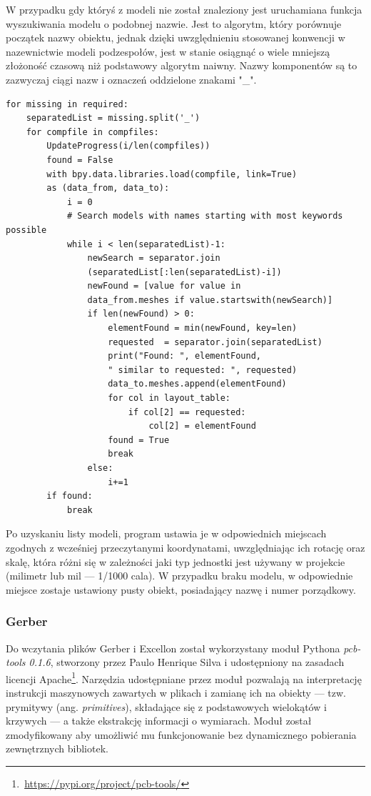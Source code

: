 \documentclass[brudnopis]{xmgr}
\begin{document}
W przypadku gdy któryś z modeli nie został znaleziony jest uruchamiana funkcja wyszukiwania modelu o podobnej nazwie. Jest to algorytm, który porównuje początek nazwy obiektu, jednak dzięki uwzględnieniu stosowanej konwencji w nazewnictwie modeli podzespołów, jest w stanie osiągnąć o wiele mniejszą złożoność czasową niż podstawowy algorytm naiwny. Nazwy komponentów są to zazwyczaj ciągi nazw i oznaczeń oddzielone znakami "\_".
\begin{lstlisting}
for missing in required:
    separatedList = missing.split('_')
    for compfile in compfiles:
        UpdateProgress(i/len(compfiles))
        found = False
        with bpy.data.libraries.load(compfile, link=True)
        as (data_from, data_to):
            i = 0
            # Search models with names starting with most keywords possible
            while i < len(separatedList)-1:
                newSearch = separator.join
                (separatedList[:len(separatedList)-i])
                newFound = [value for value in
                data_from.meshes if value.startswith(newSearch)]
                if len(newFound) > 0:
                    elementFound = min(newFound, key=len)
                    requested  = separator.join(separatedList)
                    print("Found: ", elementFound,
                    " similar to requested: ", requested)
                    data_to.meshes.append(elementFound)
                    for col in layout_table:
                        if col[2] == requested:
                            col[2] = elementFound
                    found = True
                    break
                else:
                    i+=1
        if found:
            break
\end{lstlisting}
Po uzyskaniu listy modeli, program ustawia je w odpowiednich miejscach zgodnych z wcześniej przeczytanymi koordynatami, uwzględniając ich rotację oraz skalę, która różni się w zależności jaki typ jednostki jest używany w projekcie (milimetr lub mil --- 1/1000 cala). W przypadku braku modelu, w odpowiednie miejsce zostaje ustawiony pusty obiekt, posiadający nazwę i numer porządkowy.
\subsubsection{Gerber}
Do wczytania plików Gerber i Excellon został wykorzystany moduł Pythona \emph{pcb-tools 0.1.6}, stworzony przez Paulo Henrique Silva i udostępniony na zasadach licencji Apache\footnote{\,\url{https://pypi.org/project/pcb-tools/}}. Narzędzia udostępniane przez moduł pozwalają na interpretację instrukcji maszynowych zawartych w plikach i zamianę ich na obiekty --- tzw. prymitywy (ang. \emph{primitives}), składające się z podstawowych wielokątów i krzywych --- a także ekstrakcję informacji o wymiarach. Moduł został zmodyfikowany aby umożliwić mu funkcjonowanie bez dynamicznego pobierania zewnętrznych bibliotek.
\end{document}
